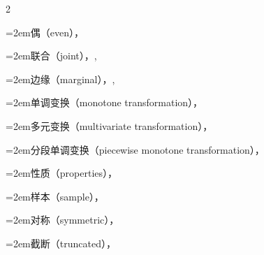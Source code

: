 \begin{multicols}{2}
\par\noindent\hangindent=2em\hspace*{1em}\label{idx:832}偶（even），\hyperref[exercise:2.25]{\pageref*{exercise:2.25}}\par
\par\noindent\hangindent=2em\hspace*{1em}\label{idx:833}联合（joint），\hyperref[def:4.1.10]{\pageref*{def:4.1.10}}, \hyperref[eq:4.6.2]{\pageref*{eq:4.6.2}}\par
\par\noindent\hangindent=2em\hspace*{1em}\label{idx:834}边缘（marginal），\hyperref[eq:4.1.2]{\pageref*{eq:4.1.2}}, \hyperref[idxocc:834:176]{\pageref*{idxocc:834:176}}\par
\par\noindent\hangindent=2em\hspace*{1em}\label{idx:835}单调变换（monotone transformation），\hyperref[thm:2.1.5]{\pageref*{thm:2.1.5}}\par
\par\noindent\hangindent=2em\hspace*{1em}\label{idx:836}多元变换（multivariate transformation），\hyperref[eq:4.6.7]{\pageref*{eq:4.6.7}}\par
\par\noindent\hangindent=2em\hspace*{1em}\label{idx:837}分段单调变换（piecewise monotone transformation），\hyperref[thm:2.1.8]{\pageref*{thm:2.1.8}}\par
\par\noindent\hangindent=2em\hspace*{1em}\label{idx:838}性质（properties），\hyperref[thm:1.6.5]{\pageref*{thm:1.6.5}}\par
\par\noindent\hangindent=2em\hspace*{1em}\label{idx:839}样本（sample），\hyperref[eq:5.1.1]{\pageref*{eq:5.1.1}}\par
\par\noindent\hangindent=2em\hspace*{1em}\label{idx:840}对称（symmetric），\hyperref[exercise:2.26]{\pageref*{exercise:2.26}}\par
\par\noindent\hangindent=2em\hspace*{1em}\label{idx:841}截断（truncated），\hyperref[exercise:1.52]{\pageref*{exercise:1.52}}\par

\end{multicols}
